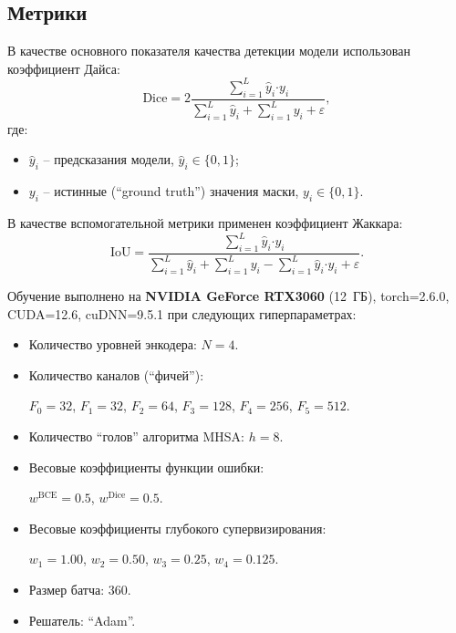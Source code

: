 \subsection{Метрики}
В качестве основного показателя качества детекции модели использован коэффициент Дайса:
\begin{equation*}
    \text{Dice} = 2 \frac{\sum_{i=1}^{L} \hat{y}_i \mathord{\cdot} y_i}{\sum_{i=1}^{L} \hat{y}_i + \sum_{i=1}^{L} y_i + \varepsilon},
\end{equation*}
где:
\begin{itemize}
    \item ${\hat{y}_i}$ -- предсказания модели, ${\hat{y}_i \in \{0, 1\}}$;
    \item ${y_i}$ -- истинные (\enquote{ground truth}) значения маски, ${y_i \in \{0, 1\}}$.
\end{itemize}

В качестве вспомогательной метрики применен коэффициент Жаккара:
\begin{equation*}
    \text{IoU} = \frac{\sum_{i=1}^{L} \hat{y}_i \mathord{\cdot} y_i}{\sum_{i=1}^{L} \hat{y}_i + \sum_{i=1}^{L} y_i - \sum_{i=1}^{L} \hat{y}_i \mathord{\cdot} y_i + \varepsilon}.
\end{equation*}

Обучение выполнено на \textbf{NVIDIA GeForce RTX3060} (12~ГБ), torch=2.6.0, CUDA=12.6, cuDNN=9.5.1 при следующих гиперпараметрах:
\begin{itemize}
    \item Количество уровней энкодера: ${N=4}$.
    \item Количество каналов (\enquote{фичей}):\par
    ${F_0=32}$, ${F_1=32}$, ${F_2=64}$, ${F_3=128}$, ${F_4=256}$, ${F_5=512}$.
    \item Количество \enquote{голов} алгоритма MHSA: ${h=8}$.
    \item Весовые коэффициенты функции ошибки:\par
    ${w^\text{BCE}=\num{0.5}}$, ${w^\text{Dice}=\num{0.5}}$.
    \item Весовые коэффициенты глубокого супервизирования:\par
    ${w_1 = \num{1.00}}$, ${w_2 = \num{0.50}}$, ${w_3 = \num{0.25}}$, ${w_4 = \num{0.125}}$.
    \item Размер батча: 360.
    \item Решатель: \enquote{Adam}.
\end{itemize}

